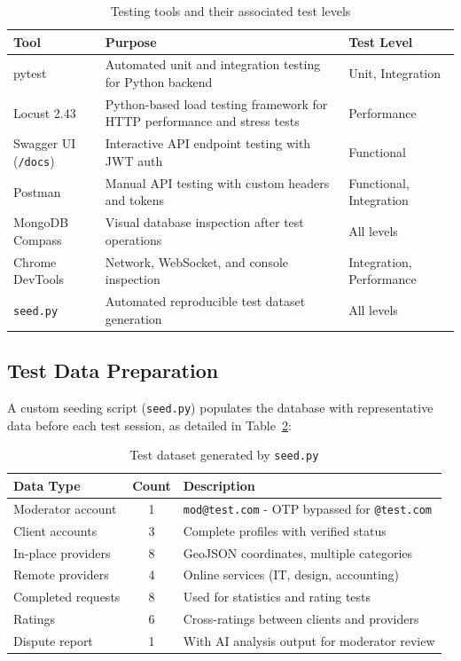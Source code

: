 \begin{table}[H]
\caption{Testing tools and their associated test levels}
\centering
\renewcommand{\arraystretch}{1.3}
\begin{tabular}{|l|p{8cm}|l|}
\hline
\rowcolor{cyan!20}
\textbf{Tool} & \textbf{Purpose} & \textbf{Test Level} \\
\hline
pytest & Automated unit and integration testing for Python backend & Unit, Integration \\
\hline
Locust 2.43 & Python-based load testing framework for HTTP performance and stress tests & Performance \\
\hline
Swagger UI (\texttt{/docs}) & Interactive API endpoint testing with JWT auth & Functional \\
\hline
Postman & Manual API testing with custom headers and tokens & Functional, Integration \\
\hline
MongoDB Compass & Visual database inspection after test operations & All levels \\
\hline
Chrome DevTools & Network, WebSocket, and console inspection & Integration, Performance \\
\hline
\texttt{seed.py} & Automated reproducible test dataset generation & All levels \\
\hline
\end{tabular}

\label{tab:test_tools}
\end{table}

\subsection{Test Data Preparation}

A custom seeding script (\texttt{seed.py}) populates the database with representative data before each test session, as detailed in Table~\ref{tab:test_dataset}:

\begin{table}[H]
\caption{Test dataset generated by \texttt{seed.py}}
\centering
\begin{tabular}{|l|c|p{10cm}|}
\hline
\textbf{Data Type} & \textbf{Count} & \textbf{Description} \\
\hline
Moderator account & 1 & \texttt{mod@test.com} - OTP bypassed for \texttt{@test.com} \\
\hline
Client accounts & 3 & Complete profiles with verified status \\
\hline
In-place providers & 8 & GeoJSON coordinates, multiple categories \\
\hline
Remote providers & 4 & Online services (IT, design, accounting) \\
\hline
Completed requests & 8 & Used for statistics and rating tests \\
\hline
Ratings & 6 & Cross-ratings between clients and providers \\
\hline
Dispute report & 1 & With AI analysis output for moderator review \\
\hline
\end{tabular}

\label{tab:test_dataset}
\end{table}

